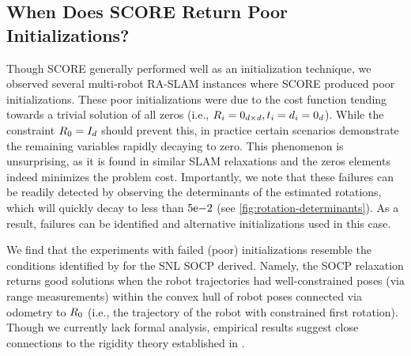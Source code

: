 \subsection{When Does SCORE Return Poor Initializations?}
\label{sec:limitations}

\ScoreDeterminantPlot

Though SCORE generally performed well as an initialization technique, we
observed several multi-robot RA-SLAM instances where SCORE produced poor
initializations. These poor initializations were due to the cost function
tending towards a trivial solution of all zeros (i.e., $R_i = 0_{d \times d},
t_i = d_i = 0_{d}$). While the constraint $R_0 = I_{d}$ should
prevent this, in practice certain scenarios demonstrate the
remaining variables rapidly decaying to zero. This phenomenon is unsurprising,
as it is found in similar SLAM relaxations \cite{Rosen15icra,carlone15aicra} and
the zeros elements indeed minimizes the problem cost. Importantly, we
note that these failures can be readily detected by observing the determinants
of the estimated rotations, which will quickly decay to less than
${5}\mathrm{e}{-2}$ (see \cref{fig:rotation-determinants}).
As a result, failures can be identified and alternative initializations used in
this case.

We find that the experiments with failed (poor) initializations resemble the
conditions identified by \cite{tseng07siam} for the SNL SOCP derived.  Namely,
the SOCP relaxation returns good solutions when the robot trajectories had
well-constrained poses (via range measurements) within the convex hull of robot
poses connected via odometry to $R_0$ (i.e., the trajectory of the robot with
constrained first rotation). Though we currently lack formal analysis, empirical
results suggest close connections to the rigidity theory established in
\cite{tseng07siam}.
